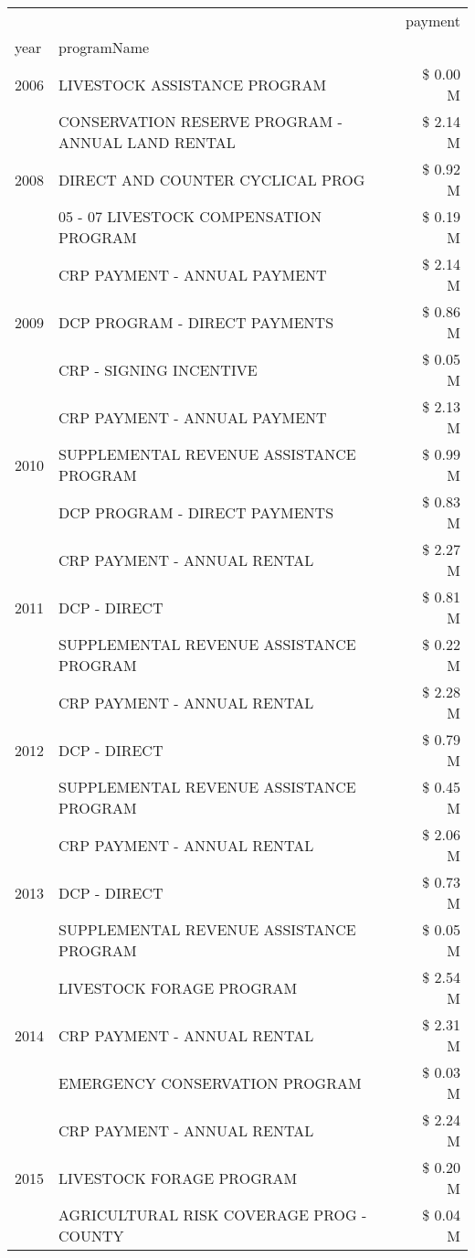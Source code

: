 \begin{tabular}{llr}
\toprule
 &  & payment \\
year & programName &  \\
\midrule
2006 & LIVESTOCK ASSISTANCE PROGRAM & \$ 0.00 M \\
\cline{1-3}
\multirow[t]{3}{*}{2008} & CONSERVATION RESERVE PROGRAM - ANNUAL LAND RENTAL & \$ 2.14 M \\
 & DIRECT AND COUNTER CYCLICAL PROG & \$ 0.92 M \\
 & 05 - 07 LIVESTOCK COMPENSATION PROGRAM & \$ 0.19 M \\
\cline{1-3}
\multirow[t]{3}{*}{2009} & CRP PAYMENT - ANNUAL PAYMENT & \$ 2.14 M \\
 & DCP PROGRAM - DIRECT PAYMENTS & \$ 0.86 M \\
 & CRP - SIGNING INCENTIVE & \$ 0.05 M \\
\cline{1-3}
\multirow[t]{3}{*}{2010} & CRP PAYMENT - ANNUAL PAYMENT & \$ 2.13 M \\
 & SUPPLEMENTAL REVENUE ASSISTANCE PROGRAM & \$ 0.99 M \\
 & DCP PROGRAM - DIRECT PAYMENTS & \$ 0.83 M \\
\cline{1-3}
\multirow[t]{3}{*}{2011} & CRP PAYMENT - ANNUAL RENTAL & \$ 2.27 M \\
 & DCP - DIRECT & \$ 0.81 M \\
 & SUPPLEMENTAL REVENUE ASSISTANCE PROGRAM & \$ 0.22 M \\
\cline{1-3}
\multirow[t]{3}{*}{2012} & CRP PAYMENT - ANNUAL RENTAL & \$ 2.28 M \\
 & DCP - DIRECT & \$ 0.79 M \\
 & SUPPLEMENTAL REVENUE ASSISTANCE PROGRAM & \$ 0.45 M \\
\cline{1-3}
\multirow[t]{3}{*}{2013} & CRP PAYMENT - ANNUAL RENTAL & \$ 2.06 M \\
 & DCP - DIRECT & \$ 0.73 M \\
 & SUPPLEMENTAL REVENUE ASSISTANCE PROGRAM & \$ 0.05 M \\
\cline{1-3}
\multirow[t]{3}{*}{2014} & LIVESTOCK FORAGE PROGRAM & \$ 2.54 M \\
 & CRP PAYMENT - ANNUAL RENTAL & \$ 2.31 M \\
 & EMERGENCY CONSERVATION PROGRAM & \$ 0.03 M \\
\cline{1-3}
\multirow[t]{3}{*}{2015} & CRP PAYMENT - ANNUAL RENTAL & \$ 2.24 M \\
 & LIVESTOCK FORAGE PROGRAM & \$ 0.20 M \\
 & AGRICULTURAL RISK COVERAGE PROG - COUNTY & \$ 0.04 M \\

\end{tabular}
